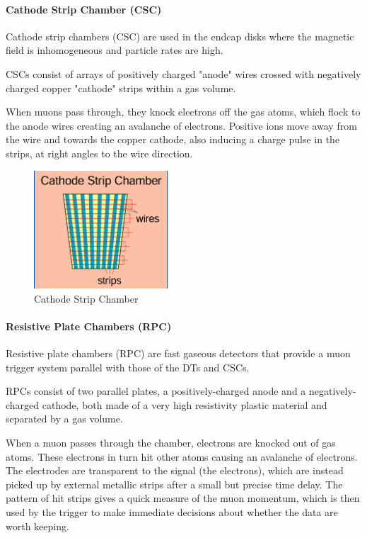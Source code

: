 \paragraph{Cathode Strip Chamber (CSC)}
Cathode strip chambers (CSC) are used in the endcap disks where the magnetic field is inhomogeneous and particle rates are high.

CSCs consist of arrays of positively charged "anode" wires crossed with negatively charged copper "cathode" strips within a gas volume.

When muons pass through, they knock electrons off the gas atoms, which flock to the anode wires creating an avalanche of electrons. Positive ions move away from the wire and towards the copper cathode, also inducing a charge pulse in the strips, at right angles to the wire direction.
\begin{figure}[H]
  \centering
\includegraphics[width=5cm]{CMS_chapter_plots/CSC}
  \caption{Cathode Strip Chamber \label{fig:CSC}}
\end{figure}

\paragraph{Resistive Plate Chambers (RPC)}
Resistive plate chambers (RPC) are fast gaseous detectors that provide a muon trigger system parallel with those of the DTs and CSCs.

RPCs consist of two parallel plates, a positively-charged anode and a negatively-charged cathode, both made of a very high resistivity plastic material and separated by a gas volume.

When a muon passes through the chamber, electrons are knocked out of gas atoms. These electrons in turn hit other atoms causing an avalanche of electrons. The electrodes are transparent to the signal (the electrons), which are instead picked up by external metallic strips after a small but precise time delay. The pattern of hit strips gives a quick measure of the muon momentum, which is then used by the trigger to make immediate decisions about whether the data are worth keeping. 

